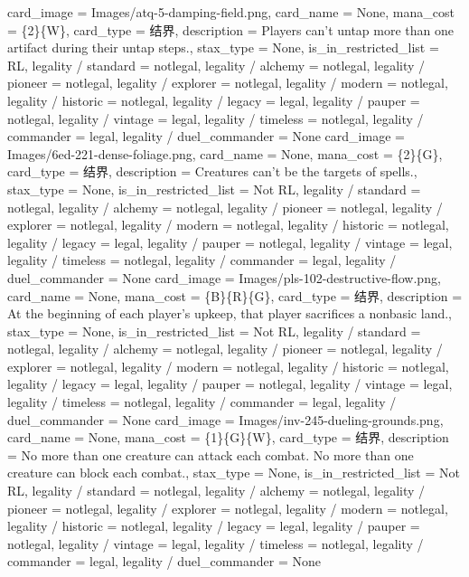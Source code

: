 \documentclass[lang = cn, color = black, 10pt]{AllThatStax}
\begin{document}
\card
{
	card_image = Images/atq-5-damping-field.png,
	card_name = None,
	mana_cost = \{2\}\{W\},
	card_type = 结界,
	description = Players can't untap more than one artifact during their untap steps.,
	stax_type = None,
	is_in_restricted_list = RL,
	legality / standard = notlegal,
	legality / alchemy = notlegal,
	legality / pioneer = notlegal,
	legality / explorer = notlegal,
	legality / modern = notlegal,
	legality / historic = notlegal,
	legality / legacy = legal,
	legality / pauper = notlegal,
	legality / vintage = legal,
	legality / timeless = notlegal,
	legality / commander = legal,
	legality / duel_commander = None
}
\card
{
	card_image = Images/6ed-221-dense-foliage.png,
	card_name = None,
	mana_cost = \{2\}\{G\},
	card_type = 结界,
	description = Creatures can't be the targets of spells.,
	stax_type = None,
	is_in_restricted_list = Not RL,
	legality / standard = notlegal,
	legality / alchemy = notlegal,
	legality / pioneer = notlegal,
	legality / explorer = notlegal,
	legality / modern = notlegal,
	legality / historic = notlegal,
	legality / legacy = legal,
	legality / pauper = notlegal,
	legality / vintage = legal,
	legality / timeless = notlegal,
	legality / commander = legal,
	legality / duel_commander = None
}
\card
{
	card_image = Images/pls-102-destructive-flow.png,
	card_name = None,
	mana_cost = \{B\}\{R\}\{G\},
	card_type = 结界,
	description = At the beginning of each player's upkeep, that player sacrifices a nonbasic land.,
	stax_type = None,
	is_in_restricted_list = Not RL,
	legality / standard = notlegal,
	legality / alchemy = notlegal,
	legality / pioneer = notlegal,
	legality / explorer = notlegal,
	legality / modern = notlegal,
	legality / historic = notlegal,
	legality / legacy = legal,
	legality / pauper = notlegal,
	legality / vintage = legal,
	legality / timeless = notlegal,
	legality / commander = legal,
	legality / duel_commander = None
}
\card
{
	card_image = Images/inv-245-dueling-grounds.png,
	card_name = None,
	mana_cost = \{1\}\{G\}\{W\},
	card_type = 结界,
	description = No more than one creature can attack each combat.
	No more than one creature can block each combat.,
	stax_type = None,
	is_in_restricted_list = Not RL,
	legality / standard = notlegal,
	legality / alchemy = notlegal,
	legality / pioneer = notlegal,
	legality / explorer = notlegal,
	legality / modern = notlegal,
	legality / historic = notlegal,
	legality / legacy = legal,
	legality / pauper = notlegal,
	legality / vintage = legal,
	legality / timeless = notlegal,
	legality / commander = legal,
	legality / duel_commander = None
}
\card
\end{document}
